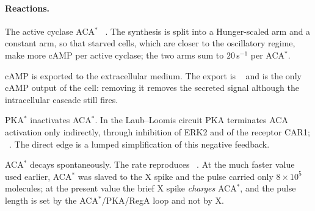 \paragraph{Reactions.}
\begin{description}\itemsep0pt
\item[9.1/9.2] The active cyclase ACA$^*$ ~\cite{segall1995}. The synthesis is split into a Hunger-scaled arm and a constant arm, so that starved cells, which are closer to the oscillatory regime, make more cAMP per active cyclase; the two arms sum to $20$\,s$^{-1}$ per ACA$^*$.
\item[9.2b] cAMP is exported to the extracellular medium. The export is ~\cite{dinauer1980} and is the only cAMP output of the cell: removing it removes the secreted signal although the intracellular cascade still fires.
\item[9.3] PKA$^*$ inactivates ACA$^*$. In the Laub--Loomis circuit PKA terminates ACA activation only indirectly, through inhibition of ERK2 and of the receptor CAR1; ~\cite{laub1998}. The direct edge is a lumped simplification of this negative feedback.
\item[8.12] ACA$^*$ decays spontaneously. The rate reproduces ~\cite{cai2010}. At the much faster value used earlier, ACA$^*$ was slaved to the X spike and the pulse carried only $8\times10^5$ molecules; at the present value the brief X spike \emph{charges} ACA$^*$, and the pulse length is set by the ACA$^*$/PKA/RegA loop and not by X.
\end{description}

